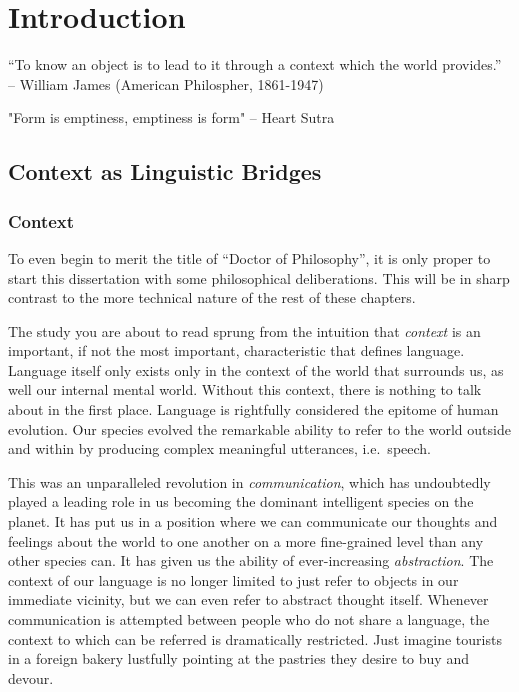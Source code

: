 \chapter{Introduction}
\label{chap:intro}

“To know an object is to lead to it through a context which the world provides.” -- William James (American Philospher, 1861-1947)

"Form is emptiness, emptiness is form" -- Heart Sutra

\section{Context as Linguistic Bridges}

\subsection{Context}

To even begin to merit the title of ``Doctor of Philosophy'', it is only proper
to start this dissertation with some philosophical deliberations. This will be
in sharp contrast to the more technical nature of the rest of these chapters.

The study you are about to read sprung from the intuition that \emph{context}
is an important, if not the most important, characteristic that defines
language. Language itself only exists only in the context of the world that
surrounds us, as well our internal mental world. Without this context, there is
nothing to talk about in the first place. Language is rightfully considered the
epitome of human evolution. Our species evolved the remarkable ability to refer
to the world outside and within by producing complex meaningful utterances,
i.e.\ speech. 


This was an unparalleled revolution in \emph{communication}, which has
undoubtedly played a leading role in us becoming the dominant intelligent
species on the planet. It has put us in a position where we can communicate our
thoughts and feelings about the world to one another on a more fine-grained
level than any other species can. It has given us the ability of
ever-increasing \emph{abstraction}. The context of our language is no longer
limited to just refer to objects in our immediate vicinity, but we can even
refer to abstract thought itself. Whenever communication is attempted between
people who do not share a language, the context to which can be referred is
dramatically restricted.  Just imagine tourists in a foreign bakery lustfully
pointing at the pastries they desire to buy and devour. 

